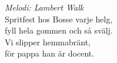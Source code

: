 {\footnotesize\textit{Melodi: Lambert Walk}}\\
\vspace{10pt}
Spritfest hos Bosse varje helg,\\
fyll hela gommen och så svälj.\\
Vi slipper hemmabränt,\\
för pappa han är docent.
